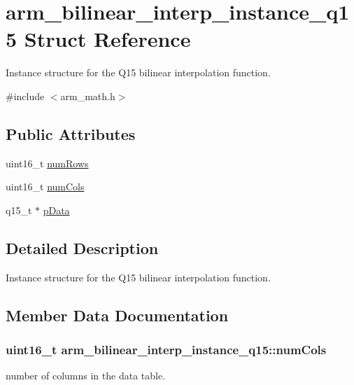 \hypertarget{structarm__bilinear__interp__instance__q15}{}\section{arm\+\_\+bilinear\+\_\+interp\+\_\+instance\+\_\+q15 Struct Reference}
\label{structarm__bilinear__interp__instance__q15}


Instance structure for the Q15 bilinear interpolation function.  




{\ttfamily \#include $<$arm\+\_\+math.\+h$>$}

\subsection*{Public Attributes}
\begin{DoxyCompactItemize}
\item 
uint16\+\_\+t \hyperlink{structarm__bilinear__interp__instance__q15_a2130ae30a804995a9f5d0e2189e08565}{num\+Rows}
\item 
uint16\+\_\+t \hyperlink{structarm__bilinear__interp__instance__q15_a7fa8772d01583374ff8ac18205a26a37}{num\+Cols}
\item 
q15\+\_\+t $\ast$ \hyperlink{structarm__bilinear__interp__instance__q15_a50d75b1316cee3e0dfad6dcc4c9a2954}{p\+Data}
\end{DoxyCompactItemize}


\subsection{Detailed Description}
Instance structure for the Q15 bilinear interpolation function. 

\subsection{Member Data Documentation}
\subsubsection[{\texorpdfstring{num\+Cols}{numCols}}]{\setlength{\rightskip}{0pt plus 5cm}uint16\+\_\+t arm\+\_\+bilinear\+\_\+interp\+\_\+instance\+\_\+q15\+::num\+Cols}\hypertarget{structarm__bilinear__interp__instance__q15_a7fa8772d01583374ff8ac18205a26a37}{}\label{structarm__bilinear__interp__instance__q15_a7fa8772d01583374ff8ac18205a26a37}
number of columns in the data table. 
